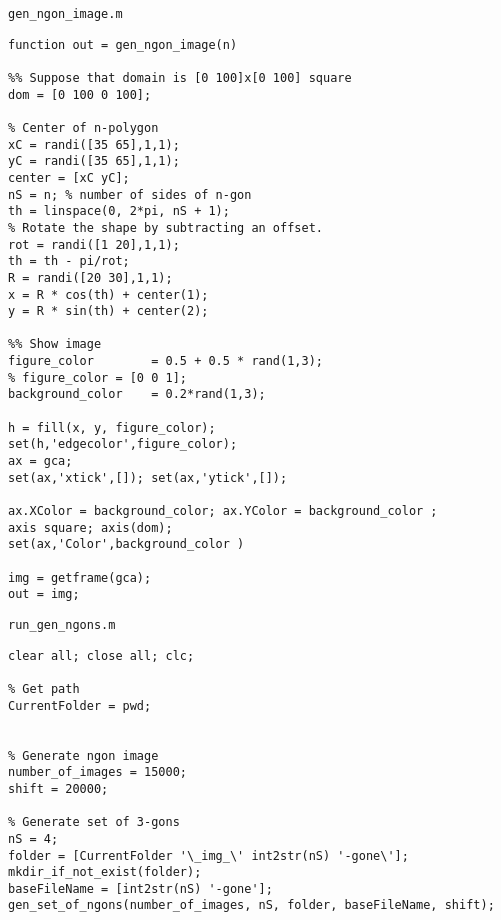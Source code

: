 \documentclass[12pt,a4paper]{article}
\begin{document}
\verb|gen_ngon_image.m|
\begin{lstlisting}
function out = gen_ngon_image(n)

%% Suppose that domain is [0 100]x[0 100] square
dom = [0 100 0 100];

% Center of n-polygon
xC = randi([35 65],1,1);
yC = randi([35 65],1,1);
center = [xC yC];
nS = n; % number of sides of n-gon
th = linspace(0, 2*pi, nS + 1);
% Rotate the shape by subtracting an offset.
rot = randi([1 20],1,1);
th = th - pi/rot;
R = randi([20 30],1,1);
x = R * cos(th) + center(1);
y = R * sin(th) + center(2);

%% Show image
figure_color        = 0.5 + 0.5 * rand(1,3);
% figure_color = [0 0 1];
background_color    = 0.2*rand(1,3);

h = fill(x, y, figure_color);
set(h,'edgecolor',figure_color);
ax = gca;
set(ax,'xtick',[]); set(ax,'ytick',[]);

ax.XColor = background_color; ax.YColor = background_color ;
axis square; axis(dom);
set(ax,'Color',background_color )

img = getframe(gca);
out = img;
\end{lstlisting}

\verb|run_gen_ngons.m|
\begin{lstlisting}
clear all; close all; clc;

% Get path
CurrentFolder = pwd;


% Generate ngon image
number_of_images = 15000;
shift = 20000;

% Generate set of 3-gons
nS = 4;
folder = [CurrentFolder '\_img_\' int2str(nS) '-gone\'];
mkdir_if_not_exist(folder);
baseFileName = [int2str(nS) '-gone'];
gen_set_of_ngons(number_of_images, nS, folder, baseFileName, shift);
\end{lstlisting}
\end{document}
